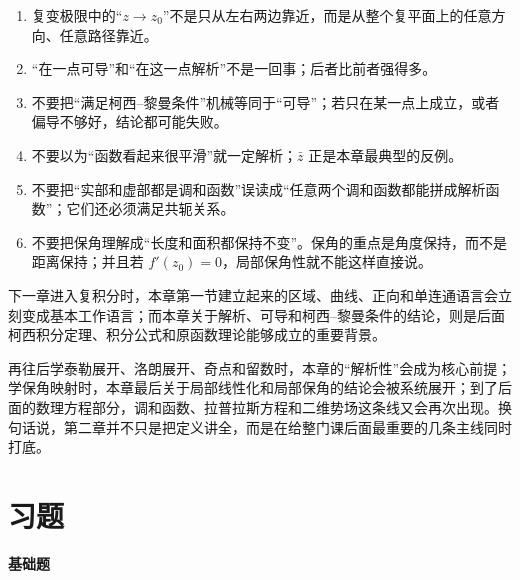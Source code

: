\begin{jinshi}[本章最容易混淆的地方]
\begin{enumerate}
    \item 复变极限中的``$z\to z_0$''不是只从左右两边靠近，而是从整个复平面上的任意方向、任意路径靠近。
    \item ``在一点可导''和``在这一点解析''不是一回事；后者比前者强得多。
    \item 不要把``满足柯西--黎曼条件''机械等同于``可导''；若只在某一点上成立，或者偏导不够好，结论都可能失败。
    \item 不要以为``函数看起来很平滑''就一定解析；$\bar z$ 正是本章最典型的反例。
    \item 不要把``实部和虚部都是调和函数''误读成``任意两个调和函数都能拼成解析函数''；它们还必须满足共轭关系。
    \item 不要把保角理解成``长度和面积都保持不变''。保角的重点是角度保持，而不是距离保持；并且若 $f'(z_0)=0$，局部保角性就不能这样直接说。
\end{enumerate}
\end{jinshi}

\begin{tishi}[和后续内容的联系]
下一章进入复积分时，本章第一节建立起来的区域、曲线、正向和单连通语言会立刻变成基本工作语言；而本章关于解析、可导和柯西--黎曼条件的结论，则是后面柯西积分定理、积分公式和原函数理论能够成立的重要背景。

再往后学泰勒展开、洛朗展开、奇点和留数时，本章的``解析性''会成为核心前提；学保角映射时，本章最后关于局部线性化和局部保角的结论会被系统展开；到了后面的数理方程部分，调和函数、拉普拉斯方程和二维势场这条线又会再次出现。换句话说，第二章并不只是把定义讲全，而是在给整门课后面最重要的几条主线同时打底。
\end{tishi}

\section{习题}

\textbf{基础题}

